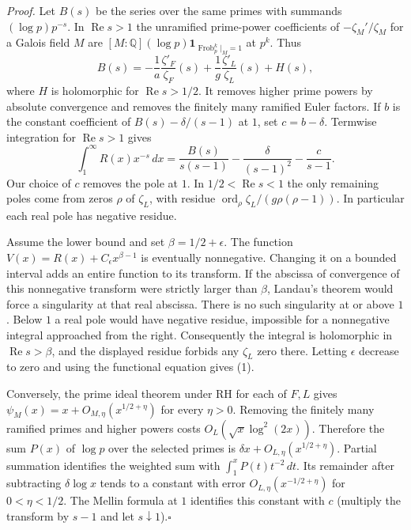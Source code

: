 \noindent\emph{Proof.}
Let $B(s)$ be the series over the same primes with summands
$(\log p)p^{-s}$. In $\operatorname{Re}s>1$ the unramified
prime-power coefficients of $-\zeta_M'/\zeta_M$ for a Galois field $M$
are $[M:\mathbb Q](\log p)\mathbf 1_{\operatorname{Frob}_p^k|_M=1}$
at $p^k$. Thus
\[
 B(s)=-\frac{1}{a}\frac{\zeta'_F}{\zeta_F}(s)
             +\frac{1}{g}\frac{\zeta'_L}{\zeta_L}(s)+H(s),
\]
where $H$ is holomorphic for $\operatorname{Re}s>1/2$. It removes
higher prime powers by absolute convergence and removes the finitely
many ramified Euler factors. If $b$ is the constant coefficient of
$B(s)-\delta/(s-1)$ at $1$, set $c=b-\delta$. Termwise integration for
$\operatorname{Re}s>1$ gives
\[
 \int_1^\infty R(x)x^{-s}\,dx=
 \frac{B(s)}{s(s-1)}-\frac{\delta}{(s-1)^2}-\frac{c}{s-1}.
\]
Our choice of $c$ removes the pole at $1$. In $1/2<\operatorname{Re}s<1$
the only remaining poles come from zeros $\rho$ of $\zeta_L$, with
residue $\operatorname{ord}_\rho\zeta_L/(g\rho(\rho-1))$.
In particular each real pole has negative residue.

Assume the lower bound and set $\beta=1/2+\epsilon$. The function
$V(x)=R(x)+C_\epsilon x^{\beta-1}$ is eventually nonnegative.
Changing it on a bounded interval adds an entire function to its
transform. If the abscissa of convergence of this nonnegative transform
were strictly larger than $\beta$, Landau's theorem would force a
singularity at that real abscissa. There is no such singularity at or
above $1$. Below $1$ a real pole would have negative residue, impossible
for a nonnegative integral approached from the right. Consequently
the integral is holomorphic in $\operatorname{Re}s>\beta$, and the
displayed residue forbids any $\zeta_L$ zero there. Letting $\epsilon$
decrease to zero and using the functional equation gives (1).

Conversely, the prime ideal theorem under RH for each of $F,L$ gives
$\psi_M(x)=x+O_{M,\eta}(x^{1/2+\eta})$ for every $\eta>0$.
Removing the finitely many ramified primes and higher powers
costs $O_L(\sqrt{x}\log^2(2x))$. Therefore the sum $P(x)$ of $\log p$
over the selected primes is $\delta x+O_{L,\eta}(x^{1/2+\eta})$.
Partial summation identifies the weighted sum with
$\int_1^xP(t)t^{-2}\,dt$. Its remainder after subtracting
$\delta\log x$ tends to a constant with error
$O_{L,\eta}(x^{-1/2+\eta})$ for $0<\eta<1/2$. The Mellin formula
at $1$ identifies this constant with $c$ (multiply the transform
by $s-1$ and let $s\downarrow1$).\hfill$\square$

